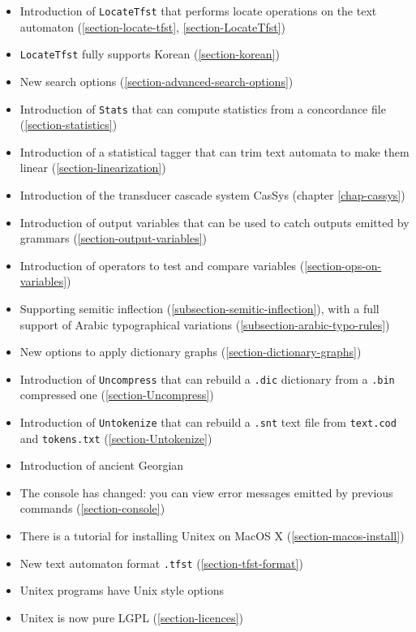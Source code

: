 \begin{itemize}
  \item Introduction of \verb$LocateTfst$ that performs locate operations
        on the text automaton (\ref{section-locate-tfst}, \ref{section-LocateTfst})
  \item \verb$LocateTfst$ fully supports Korean (\ref{section-korean})
  \item New search options (\ref{section-advanced-search-options})
  \item Introduction of \verb$Stats$ that can compute statistics from a
        concordance file (\ref{section-statistics})
  \item Introduction of a statistical tagger that can trim text automata to make them
        linear (\ref{section-linearization})
  \item Introduction of the transducer cascade system CasSys (chapter \ref{chap-cassys})
  \item Introduction of output variables that can be used to catch outputs emitted
        by grammars (\ref{section-output-variables})
  \item Introduction of operators to test and compare variables (\ref{section-ops-on-variables})
  \item Supporting semitic inflection (\ref{subsection-semitic-inflection}), with a full support 
        of Arabic typographical variations (\ref{subsection-arabic-typo-rules})
  \item New options to apply dictionary graphs (\ref{section-dictionary-graphs}) 
  \item Introduction of \verb$Uncompress$ that can rebuild a \verb$.dic$
        dictionary from a \verb$.bin$ compressed one (\ref{section-Uncompress})
  \item Introduction of \verb$Untokenize$ that can rebuild a \verb$.snt$
        text file from \verb$text.cod$ and \verb$tokens.txt$ (\ref{section-Untokenize})
  \item Introduction of ancient Georgian
  \item The console has changed: you can view error messages emitted by
        previous commands (\ref{section-console})
  \item There is a tutorial for installing Unitex on MacOS X 
       (\ref{section-macos-install})
  \item New text automaton format \verb+.tfst+ (\ref{section-tfst-format})          
  \item Unitex programs have Unix style options
  \item Unitex is now pure LGPL (\ref{section-licences})

\end{itemize}
